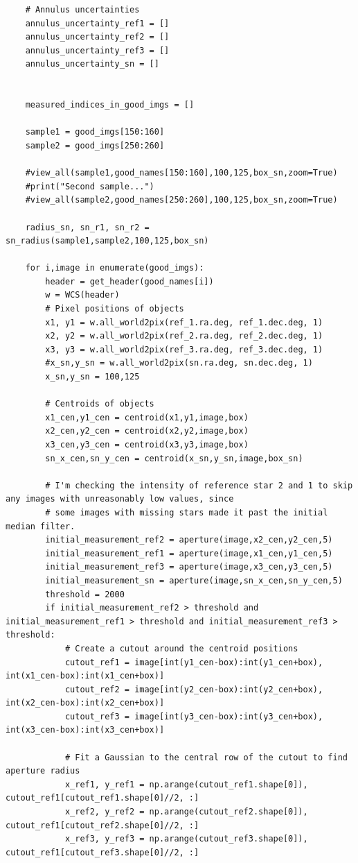 \documentclass{article}
\begin{document}
\begin{appendices}
\begin{verbatim}
    # Annulus uncertainties
    annulus_uncertainty_ref1 = []
    annulus_uncertainty_ref2 = []  
    annulus_uncertainty_ref3 = []
    annulus_uncertainty_sn = []
    
    
    measured_indices_in_good_imgs = []
    
    sample1 = good_imgs[150:160]
    sample2 = good_imgs[250:260]
    
    #view_all(sample1,good_names[150:160],100,125,box_sn,zoom=True)
    #print("Second sample...")
    #view_all(sample2,good_names[250:260],100,125,box_sn,zoom=True)
    
    radius_sn, sn_r1, sn_r2 = sn_radius(sample1,sample2,100,125,box_sn)
    
    for i,image in enumerate(good_imgs):
        header = get_header(good_names[i])
        w = WCS(header)
        # Pixel positions of objects
        x1, y1 = w.all_world2pix(ref_1.ra.deg, ref_1.dec.deg, 1)
        x2, y2 = w.all_world2pix(ref_2.ra.deg, ref_2.dec.deg, 1)
        x3, y3 = w.all_world2pix(ref_3.ra.deg, ref_3.dec.deg, 1)
        #x_sn,y_sn = w.all_world2pix(sn.ra.deg, sn.dec.deg, 1)
        x_sn,y_sn = 100,125
    
        # Centroids of objects
        x1_cen,y1_cen = centroid(x1,y1,image,box)
        x2_cen,y2_cen = centroid(x2,y2,image,box)
        x3_cen,y3_cen = centroid(x3,y3,image,box)
        sn_x_cen,sn_y_cen = centroid(x_sn,y_sn,image,box_sn)
        
        # I'm checking the intensity of reference star 2 and 1 to skip any images with unreasonably low values, since
        # some images with missing stars made it past the initial median filter.     
        initial_measurement_ref2 = aperture(image,x2_cen,y2_cen,5)
        initial_measurement_ref1 = aperture(image,x1_cen,y1_cen,5)
        initial_measurement_ref3 = aperture(image,x3_cen,y3_cen,5)
        initial_measurement_sn = aperture(image,sn_x_cen,sn_y_cen,5)
        threshold = 2000
        if initial_measurement_ref2 > threshold and initial_measurement_ref1 > threshold and initial_measurement_ref3 > threshold:        
            # Create a cutout around the centroid positions
            cutout_ref1 = image[int(y1_cen-box):int(y1_cen+box), int(x1_cen-box):int(x1_cen+box)]
            cutout_ref2 = image[int(y2_cen-box):int(y2_cen+box), int(x2_cen-box):int(x2_cen+box)]
            cutout_ref3 = image[int(y3_cen-box):int(y3_cen+box), int(x3_cen-box):int(x3_cen+box)]
    
            # Fit a Gaussian to the central row of the cutout to find aperture radius
            x_ref1, y_ref1 = np.arange(cutout_ref1.shape[0]), cutout_ref1[cutout_ref1.shape[0]//2, :]
            x_ref2, y_ref2 = np.arange(cutout_ref2.shape[0]), cutout_ref1[cutout_ref2.shape[0]//2, :]
            x_ref3, y_ref3 = np.arange(cutout_ref3.shape[0]), cutout_ref1[cutout_ref3.shape[0]//2, :]
    

\end{verbatim}
\end{appendices}
\end{document}
